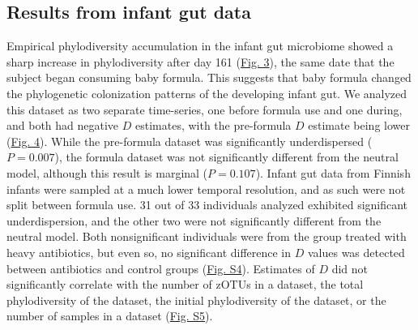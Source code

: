 \documentclass{article}
\begin{document}
\subsection{Results from infant gut data}
Empirical phylodiversity accumulation in the infant gut microbiome \cite{Koenig2011} showed a sharp increase in phylodiversity after day 161 (\hyperref[sec:figure3]{Fig. 3}), the same date that the subject began consuming baby formula. This suggests that baby formula changed the phylogenetic colonization patterns of the developing infant gut. We analyzed this dataset as two separate time-series, one before formula use and one during, and both had negative \(D\) estimates, with the pre-formula \(D\) estimate being lower (\hyperref[sec:figure4]{Fig. 4}). While the pre-formula dataset was significantly underdispersed (\(P = 0.007\)), the formula dataset was not significantly different from the neutral model, although this result is marginal (\(P = 0.107\)). Infant gut data from Finnish infants \cite{Yassour2016} were sampled at a much lower temporal resolution, and as such were not split between formula use. 31 out of 33 individuals analyzed exhibited significant underdispersion, and the other two were not significantly different from the neutral model. Both nonsignificant individuals were from the group treated with heavy antibiotics, but even so, no significant difference in \(D\) values was detected between antibiotics and control groups (\hyperref[sec:figureS4]{Fig. S4}). Estimates of \(D\) did not significantly correlate with the number of zOTUs in a dataset, the total phylodiversity of the dataset, the initial phylodiversity of the dataset, or the number of samples in a dataset (\hyperref[sec:figureS5]{Fig. S5}). 


\end{document}
